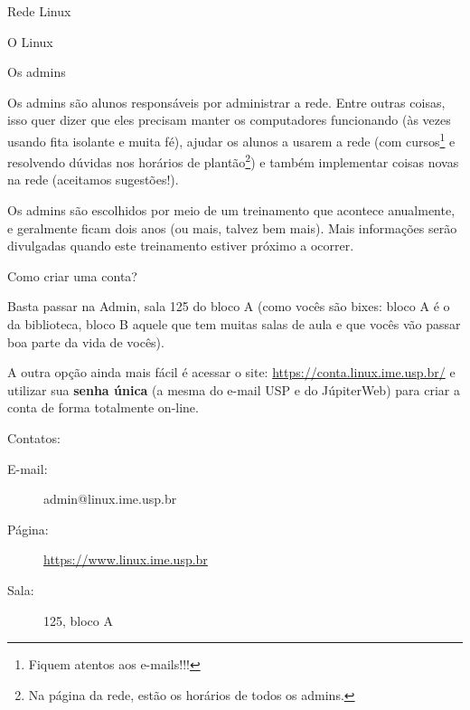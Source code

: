 \begin{subsecao}{Rede Linux}
\begin{subsubsecao}{O Linux}
\end{subsubsecao}

\begin{subsubsecao}{Os admins}

Os admins são alunos responsáveis por administrar a rede. Entre outras coisas,
isso quer dizer que eles precisam manter os computadores funcionando (às vezes usando fita isolante e muita fé), ajudar os alunos a
usarem a rede (com cursos\footnote{ Fiquem atentos aos e-mails!!!} e resolvendo
dúvidas nos horários de plantão\footnote{ Na página da rede, estão os horários
de todos os admins.}) e também implementar coisas novas na rede (aceitamos
sugestões!).

Os admins são escolhidos por meio de um treinamento que acontece anualmente,
e geralmente ficam dois anos (ou mais, talvez bem mais).
Mais informações serão divulgadas quando este treinamento estiver próximo a ocorrer.

\end{subsubsecao}
\begin{subsubsecao}{Como criar uma conta?}

Basta passar na Admin, sala 125 do bloco A (como vocês são bixes: bloco A é o da
biblioteca, bloco B aquele que tem muitas salas de aula e que vocês vão passar boa
parte da vida de vocês).

A outra opção ainda mais fácil é acessar o site: \url{https://conta.linux.ime.usp.br/}
e utilizar sua \textbf{senha única} (a mesma do e-mail USP e do JúpiterWeb) para criar
a conta de forma totalmente on-line.

Contatos:

\vspace{-1em}

\begin{description}
\item [E-mail:] admin@linux.ime.usp.br
\item [Página:] \url{https://www.linux.ime.usp.br}
\item [Sala:] 125, bloco A
\end{description}

\vspace{-.5em}

\end{subsubsecao}

\end{subsecao}
